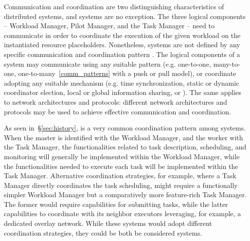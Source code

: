 \documentclass{sig-alternate}
\begin{document}

Communication and coordination are two distinguishing characteristics of
distributed systems, and \pilotjob systems are no exception. The three logical
components -- Workload Manager, Pilot Manager, and the Task Manager -- need to
communicate in order to coordinate the execution of the given workload on the
instantiated resource placeholders.  Nonetheless, \pilotjob systems are not
defined by any specific communication and coordination pattern . The logical
components of a \pilotjob system may communicate using any suitable pattern
(e.g. one-to-one, many-to-one, one-to-many~\ref{comm_patterns} with a push or
pull model), or coordinate adopting any suitable mechanism (e.g. time
synchronization, static or dynamic coordinator election, local or global
information sharing, or \MW). The same applies to network architectures and
protocols: different network architectures and protocols may be used to achieve
effective communication and coordination.


As seen in~\S\ref{sec:history}, \MW is a very common coordination pattern among
\pilotjob systems. When the master is identified with the Workload Manager, and
the worker with the Task Manager, the functionalities related to task
description, scheduling, and monitoring will generally be implemented within the
Workload Manager, while the functionalities needed to execute each task will be
implemented within the Task Manager. Alternative coordination strategies, for
example, where a Task Manager directly coordinates the task scheduling, might
require a functionally simpler Workload Manager but a comparatively more
feature-rich Task Manager. The former would require capabilities for submitting
tasks, while the latter capabilities to coordinate with its neighbor executors
leveraging, for example, a dedicated overlay network. While these systems would
adopt different coordination strategies, they could be both be considered
\pilotjob systems.
\end{document}

